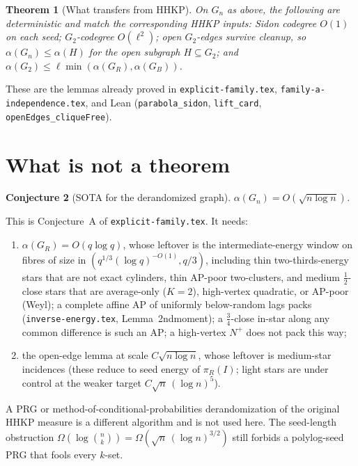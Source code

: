 \documentclass[11pt]{article}
\newtheorem{theorem}{Theorem}
\newtheorem{conjecture}[theorem]{Conjecture}
\theoremstyle{definition}
\begin{document}
\begin{theorem}[What transfers from HHKP]\label{thm:transfer}
On $G_n$ as above, the following are deterministic and match the corresponding
HHKP inputs:
Sidon codegree $O(1)$ on each seed; $G_2$-codegree $O(\ell^{2})$;
open $G_2$-edges survive cleanup, so $\alpha(G_n)\le\alpha(H)$ for the open
subgraph $H\subseteq G_2$;
and $\alpha(G_2)\le\ell\min(\alpha(G_R),\alpha(G_B))$.
\end{theorem}

These are the lemmas already proved in \texttt{explicit-family.tex},
\texttt{family-a-independence.tex}, and Lean
(\texttt{parabola\_sidon}, \texttt{lift\_card}, \texttt{openEdges\_cliqueFree}).

\section{What is not a theorem}

\begin{conjecture}[SOTA for the derandomized graph]
$\alpha(G_n)=O(\sqrt{n\log n})$.
\end{conjecture}

This is Conjecture~A of \texttt{explicit-family.tex}.
It needs:
\begin{enumerate}
  \item $\alpha(G_R)=O(q\log q)$, whose leftover is the intermediate-energy
        window on fibres of size in $(q^{1/3}(\log q)^{-O(1)},q/3)$,
        including thin two-thirds-energy stars that are not exact
        cylinders, thin AP-poor two-clusters, and medium $\tfrac12$-close
        stars that are average-only ($K=2$), high-vertex quadratic, or
        AP-poor (Weyl);
        a complete affine AP of uniformly below-random lags packs
        (\texttt{inverse-energy.tex}, Lemma~2ndmoment);
        a $\tfrac34$-close in-star along any common difference is such
        an AP; a high-vertex $N^+$ does not pack this way;
  \item the open-edge lemma at scale $C\sqrt{n\log n}$, whose leftover is
        medium-star incidences (these reduce to seed energy of $\pi_R(I)$;
        light stars are under control at the weaker
        target $C\sqrt{n}\,(\log n)^{5}$).
\end{enumerate}

A PRG or method-of-conditional-probabilities derandomization of the original
HHKP measure is a different algorithm and is not used here.
The seed-length obstruction
$\Omega(\log\binom{n}{k})=\Omega(\sqrt{n}\,(\log n)^{3/2})$
still forbids a polylog-seed PRG that fools every $k$-set.
\end{document}
